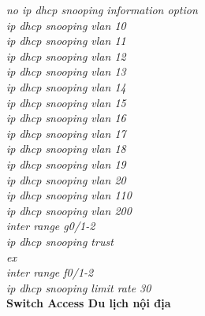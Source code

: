 \documentclass[12pt,a4paper]{report}
\begin{document}
\hspace*{2cm}\textit{no ip dhcp snooping information option\\
\hspace*{2cm}ip dhcp snooping vlan 10\\
\hspace*{2cm}ip dhcp snooping vlan 11\\
\hspace*{2cm}ip dhcp snooping vlan 12\\
\hspace*{2cm}ip dhcp snooping vlan 13\\
\hspace*{2cm}ip dhcp snooping vlan 14\\
\hspace*{2cm}ip dhcp snooping vlan 15\\
\hspace*{2cm}ip dhcp snooping vlan 16\\
\hspace*{2cm}ip dhcp snooping vlan 17\\
\hspace*{2cm}ip dhcp snooping vlan 18\\
\hspace*{2cm}ip dhcp snooping vlan 19\\
\hspace*{2cm}ip dhcp snooping vlan 20\\
\hspace*{2cm}ip dhcp snooping vlan 110\\
\hspace*{2cm}ip dhcp snooping vlan 200\\
\hspace*{2cm}inter range g0/1-2\\
\hspace*{2cm}ip dhcp snooping trust\\
\hspace*{2cm}ex\\
\hspace*{2cm}inter range f0/1-2\\
\hspace*{2cm}ip dhcp snooping limit rate 30\\}
\hspace*{1cm}\textbf{Switch Access Du lịch nội địa}\\
\end{document}
